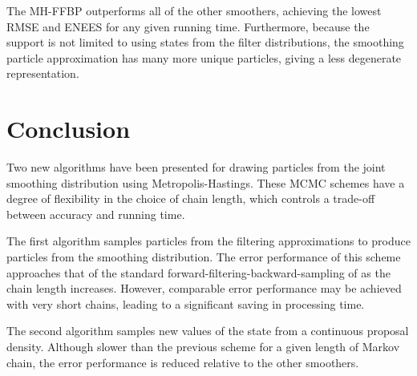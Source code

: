 \documentclass[peerreview,11pt,draftcls,onecolumn]{IEEEtran}
\begin{document}
The MH-FFBP outperforms all of the other smoothers, achieving the lowest RMSE and ENEES for any given running time. Furthermore, because the support is not limited to using states from the filter distributions, the smoothing particle approximation has many more unique particles, giving a less degenerate representation.



\section{Conclusion} \label{sec:conclusions}
Two new algorithms have been presented for drawing particles from the joint smoothing distribution using Metropolis-Hastings. These MCMC schemes have a degree of flexibility in the choice of chain length, which controls a trade-off between accuracy and running time.

The first algorithm samples particles from the filtering approximations to produce particles from the smoothing distribution. The error performance of this scheme approaches that of the standard forward-filtering-backward-sampling of \cite{Godsill2004} as the chain length increases. However, comparable error performance may be achieved with very short chains, leading to a significant saving in processing time.

The second algorithm samples new values of the state from a continuous proposal density. Although slower than the previous scheme for a given length of Markov chain, the error performance is reduced relative to the other smoothers.

\newpage






\end{document}
